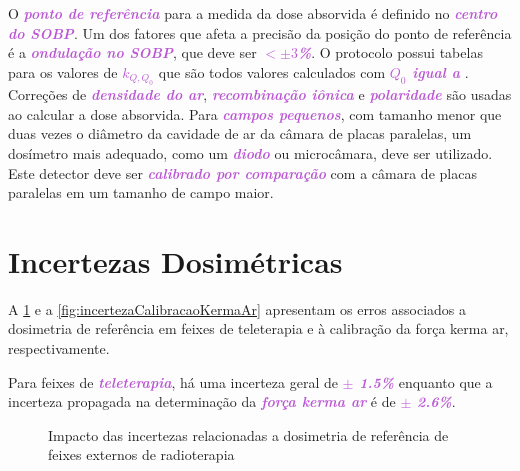 \documentclass[11pt,a4paper]{article}
\begin{document}
	O \textcolor{MediumOrchid}{\textbf{\textit{ponto de referência}}} para a medida da dose absorvida é definido no \textcolor{MediumOrchid}{\textbf{\textit{centro do SOBP}}}. Um dos fatores que afeta a precisão da posição do ponto de referência é a \textcolor{MediumOrchid}{\textbf{\textit{ondulação no SOBP}}}, que deve ser \textcolor{MediumOrchid}{\textbf{\textit{$< \pm 3$\%}}}. O protocolo possui tabelas para os valores de \textcolor{MediumOrchid}{\textbf{\textit{$k_{Q,Q_0}$}}} que são todos valores calculados com \textcolor{MediumOrchid}{\textbf{\textit{$Q_0$ igual a }}}. Correções de \textcolor{MediumOrchid}{\textbf{\textit{densidade do ar}}}, \textcolor{MediumOrchid}{\textbf{\textit{recombinação iônica}}} e \textcolor{MediumOrchid}{\textbf{\textit{polaridade}}} são usadas ao calcular a dose absorvida. Para \textcolor{MediumOrchid}{\textbf{\textit{campos pequenos}}}, com tamanho menor que duas vezes o diâmetro da cavidade de ar da câmara de placas paralelas, um dosímetro mais adequado, como um \textcolor{MediumOrchid}{\textbf{\textit{diodo}}} ou microcâmara, deve ser utilizado. Este detector deve ser \textcolor{MediumOrchid}{\textbf{\textit{calibrado por comparação}}} com a câmara de placas paralelas em um tamanho de campo maior.

\section{Incertezas Dosimétricas}

	A \ref{fig:incertezaDosimetricaExternalBeam} e a \ref{fig:incertezaCalibracaoKermaAr} apresentam os erros associados a dosimetria de referência em feixes de teleterapia e à calibração da força kerma ar, respectivamente. 

	Para feixes de \textcolor{MediumOrchid}{\textbf{\textit{teleterapia}}}, há uma incerteza geral de \textcolor{MediumOrchid}{\textbf{\textit{$\pm$ 1.5\%}}} enquanto que a incerteza propagada na determinação da \textcolor{MediumOrchid}{\textbf{\textit{força kerma ar}}} é de \textcolor{MediumOrchid}{\textbf{\textit{$\pm$ 2.6\%}}}.

\begin{figure}[h]
    \centering
    \caption{Impacto das incertezas relacionadas a dosimetria de referência de feixes externos de radioterapia}
    \label{fig:incertezaDosimetricaExternalBeam}
\end{figure}
\end{document}
